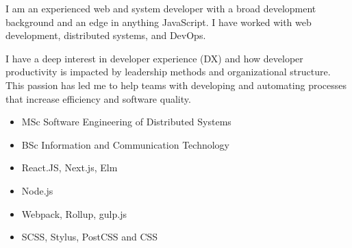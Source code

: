 I am an experienced web and system developer with a broad development background and an edge in anything JavaScript. I have worked with web development, distributed systems, and DevOps.

\vspace{\baselineskip}

I have a deep interest in developer experience (DX) and how developer productivity is impacted by leadership methods and organizational structure. This passion has led me to help teams with developing and automating processes that increase efficiency and software quality.


\begin{itemize}
    \item MSc Software Engineering of Distributed Systems
    \item BSc Information and Communication Technology
\end{itemize}









\begin{itemize}
    \item React.JS, Next.js, Elm
    \item Node.js
    \item Webpack, Rollup, gulp.js
    \item SCSS, Stylus, PostCSS and CSS
\end{itemize}


